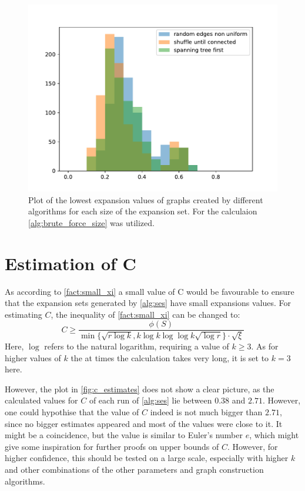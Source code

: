 \begin{figure}
	\centering
	\includegraphics[scale=1]{figures/creation_algorithm_log_lowest_expansion.pdf}
	\caption[Plot lowest expansion for different algorithms]{Plot of the lowest expansion values of graphs created by different algorithms for each size of the expansion set. For the calculaion \cref{alg:brute_force_size} was utilized.\label{fig:plot_lowest_expansion_each_size}}
\end{figure}

\section{Estimation of C}
As according to \cref{fact:small_xi} a small value of C would be favourable to ensure that the expansion sets generated by \cref{alg:ses} have small expansions values. 
For estimating $C$, the inequality of \cref{fact:small_xi} can be changed to:
\begin{equation} \label{eq:c_estimate}
C\ge \frac {\phi(S)}{ \min\{\sqrt{r \log k}, k \log k  \log \log k \sqrt{\log r} \} \cdot \sqrt{\xi}}
\end{equation} Here, $\log$ refers to the natural logarithm, requiring a value of $k\ge3$. As for higher values of $k$ the at times the calculation takes very long, it is set to $k=3$ here.


However, the plot in \cref{fig:c_estimates} does not show a clear picture, as the calculated values for $ C$ of each run of \cref{alg:ses} lie between $0.38$ and $2.71$. However, one could hypothise that the value of $C$ indeed is not much bigger than $2.71$, since no bigger estimates appeared and most of the values were close to it. It might be a coincidence, but the value is similar to Euler's number $e$, which might give some inspiration for further proofs on upper bounds of $C$. 
However, for higher confidence, this should be tested on a large scale, especially with higher $k$ and other combinations of the other parameters and graph construction algorithms.


